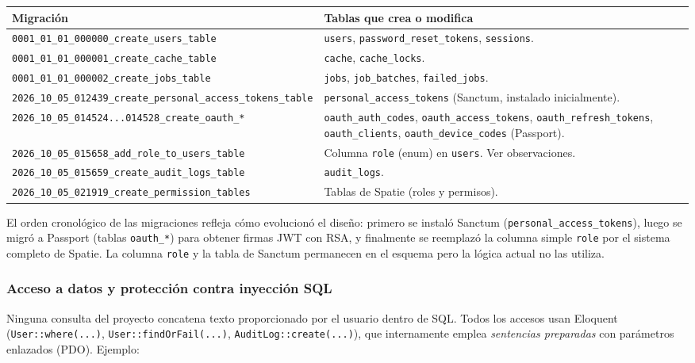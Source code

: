 \begin{longtable}{p{7.2cm}p{7.8cm}}
\toprule
\textbf{Migración} & \textbf{Tablas que crea o modifica} \\
\midrule
\endhead
\texttt{0001\_01\_01\_000000\_create\_users\_table} & \texttt{users}, \texttt{password\_reset\_tokens}, \texttt{sessions}. \\
\texttt{0001\_01\_01\_000001\_create\_cache\_table} & \texttt{cache}, \texttt{cache\_locks}. \\
\texttt{0001\_01\_01\_000002\_create\_jobs\_table} & \texttt{jobs}, \texttt{job\_batches}, \texttt{failed\_jobs}. \\
\texttt{2026\_10\_05\_012439\_create\_personal\_access\_tokens\_table} & \texttt{personal\_access\_tokens} (Sanctum, instalado inicialmente). \\
\texttt{2026\_10\_05\_014524...014528\_create\_oauth\_*} & \texttt{oauth\_auth\_codes}, \texttt{oauth\_access\_tokens}, \texttt{oauth\_refresh\_tokens}, \texttt{oauth\_clients}, \texttt{oauth\_device\_codes} (Passport). \\
\texttt{2026\_10\_05\_015658\_add\_role\_to\_users\_table} & Columna \texttt{role} (enum) en \texttt{users}. Ver observaciones. \\
\texttt{2026\_10\_05\_015659\_create\_audit\_logs\_table} & \texttt{audit\_logs}. \\
\texttt{2026\_10\_05\_021919\_create\_permission\_tables} & Tablas de Spatie (roles y permisos). \\
\bottomrule
\end{longtable}

\begin{nota}
El orden cronológico de las migraciones refleja cómo evolucionó el diseño: primero se instaló Sanctum (\texttt{personal\_access\_tokens}), luego se migró a Passport (tablas \texttt{oauth\_*}) para obtener firmas JWT con RSA, y finalmente se reemplazó la columna simple \texttt{role} por el sistema completo de Spatie. La columna \texttt{role} y la tabla de Sanctum permanecen en el esquema pero la lógica actual no las utiliza.
\end{nota}

\subsubsection{Acceso a datos y protección contra inyección SQL}
Ninguna consulta del proyecto concatena texto proporcionado por el usuario dentro de SQL. Todos los accesos usan Eloquent (\texttt{User::where(...)}, \texttt{User::findOrFail(...)}, \texttt{AuditLog::create(...)}), que internamente emplea \emph{sentencias preparadas} con parámetros enlazados (PDO). Ejemplo:

